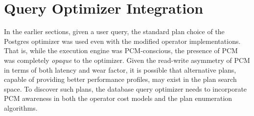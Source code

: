 \section{Query Optimizer Integration}
\label{discussion}

In the earlier sections, given a user query, the standard plan choice
of the Postgres optimizer was used even with the modified operator
implementations. That is, while the execution engine was PCM-conscious,
the presence of PCM was completely \emph{opaque} to the optimizer.
Given the read-write asymmetry of PCM in terms of both latency and wear
factor, it is possible that alternative plans, capable of providing better
performance profiles, may exist in the plan search space.  To discover
such plans, the database query optimizer needs to incorporate PCM
awareness in both the operator cost models and the plan enumeration
algorithms.

\begin{comment}
The above discussion is visually shown in Figure \ref{fig:layers}, wherein
the darkened squares indicate PCM awareness.
\begin{figure}[h]
	\subfloat[Database layers]{
	\texttt{[image: db\_levels.png]}
	}
   	\subfloat[Q13 alternate plan]{
   	\begin{tikzpicture}[scale=.8, transform shape]

\tikzstyle{every node} = [rectangle, fill=gray!5]

\node (d) at (0,3) {Index Scan / Filter};
\node (c) at (0,1.5) {CUSTOMER};

\node (s) at (3,3) {Hash};
\node (p) at (3,2.25) {Seq. Scan / Filter};
\node (a) at (3,1.5) {ORDERS};

\node (e) at (1.5,4) {Hash Left Join};
\node (f) at (1.5,5)  {Group Aggregate};
\node (g) at (1.5,6)  {Hash Aggregate};
\node (h) at (1.5,7)  {Sort};


\draw[-] (c) -- (d);
\draw[-] (a) -- (p);
\draw[-] (d) -- (e);
\draw[-] (p) -- (s);
\draw[-] (s) -- (e);
\draw[-] (e) -- (f);

\draw[-] (f) -- (g);
\draw[-] (g) -- (h);

\end{tikzpicture}
   	}

\caption{Alternative Execution Plans for Query Q13}
	\label{fig:layers}
	
\end{figure}
\end{comment}

